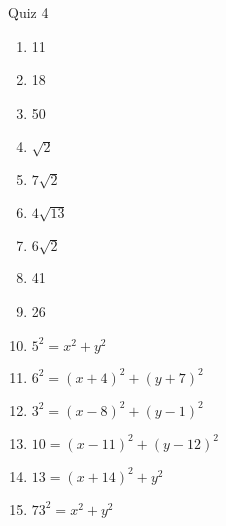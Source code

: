 \documentclass[12pt]{article}
\begin{document}
\hrulefill


Quiz 4

\begin{multicols}{2}
\begin{enumerate}

\item 11

\item 18

\item 50

\item $\sqrt{2}$

\item $7\sqrt{2}$

\item $4\sqrt{13}$

\item $6\sqrt{2}$

\item 41

\item 26

\item $5^2=x^2+y^2$

\item $6^2=(x+4)^2+(y+7)^2$

\item $3^2=(x-8)^2+(y-1)^2$

\item $10=(x-11)^2+(y-12)^2$

\item $13=(x+14)^2+y^2$

\item $73^2=x^2+y^2$

\end{enumerate}
\end{multicols}
\end{document}
